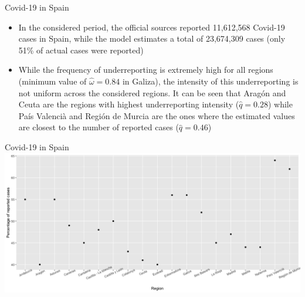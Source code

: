 \documentclass[aspectratio=169,usepdftitle=true]{beamer}
\begin{document}
\begin{frame}{Covid-19 in Spain}
\begin{itemize}
\item In the considered period, the official sources reported 11,612,568 Covid-19 cases in Spain, while the model estimates a total of 23,674,309 cases (only 51\% of actual cases were reported) \item While the frequency of underreporting is extremely high for all regions (minimum value of $\hat{\omega}=0.84$ in Galiza), the intensity of this underreporting is not uniform across the considered regions. It can be seen that Arag\'on and Ceuta are the regions with highest underreporting intensity ($\hat{q}=0.28$) while Pa\'is Valenci\`a and Regi\'on de Murcia are the ones where the estimated values are closest to the number of reported cases ($\hat{q}=0.46$)
\end{itemize}
\end{frame}

\begin{frame}[fragile]{Covid-19 in Spain}
\centering
\hspace{-1.6cm}
\includegraphics[scale=0.3]{perc_reported.png}
\end{frame}
\end{document}
